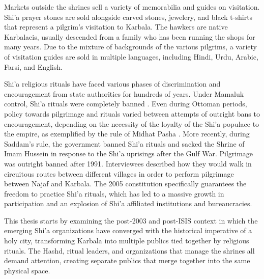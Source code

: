 Markets outside the shrines sell a variety of memorabilia and guides on visitation. Shi'a prayer stones are sold alongside carved stones, jewelery, and black t-shirts that represent a pilgrim's visitation to Karbala. The hawkers are native Karbalaeis, usually descended from a family who has been running the shops for many years. Due to the mixture of backgrounds of the various pilgrims, a variety of visitation guides are sold in multiple languages, including Hindi, Urdu, Arabic, Farsi, and English. 

Shi'a religious rituals have faced various phases of discrimination and encouragement from state authorities for hundreds of years. Under Mamaluk control, Shi'a rituals were completely banned \cite{yitzhak_nakash_attempt_1993}. Even during Ottoman periods, policy towards pilgrimage and rituals varied between attempts of outright bans to encouragement, depending on the necessity of the loyalty of the Shi'a populace to the empire, as exemplified by the rule of Midhat Pasha \cite{aghaie_martyrs_2004}. More recently, during Saddam's rule, the government banned Shi'a rituals and sacked the Shrine of Imam Hussein in response to the Shi'a uprisings after the Gulf War. Pilgrimage was outright banned after 1991. Interviewees described how they would walk in circuitous routes between different villages in order to perform pilgrimage between Najaf and Karbala. The 2005 constitution specifically guarantees the freedom to practice Shi'a rituals, which has led to a massive growth in participation and an explosion of Shi'a affiliated institutions and bureaucracies. 

This thesis starts by examining the post-2003 and post-ISIS context in which the emerging Shi'a organizations have converged with the historical imperative of a holy city, transforming Karbala into multiple publics tied together by religious rituals. The Hashd, ritual leaders, and organizations that manage the shrines all demand attention, creating separate publics that merge together into the same physical space. 